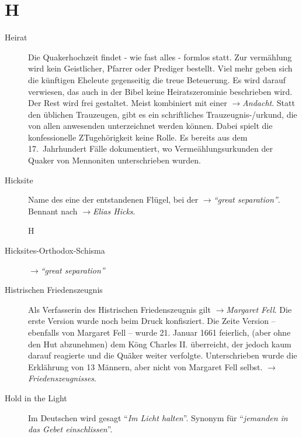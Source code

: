 \section*{H}

\articlesize

\begin{description}

 \item[Heirat] Die Quakerhochzeit findet - wie fast alles - formlos statt. Zur
 vermählung wird kein Geistlicher, Pfarrer oder Prediger bestellt. Viel mehr
 geben sich die künftigen Eheleute gegenseitig die treue Beteuerung. Es wird
 darauf verwiesen, das auch in der Bibel keine Heiratszerominie beschrieben
 wird. Der Rest wird frei gestaltet. Meist kombiniert mit einer
 $\to$\textit{Andacht}. Statt den üblichen Trauzeugen, gibt es ein schriftliches
 Trauzeugnis-/urkund, die von allen anwesenden unterzeichnet werden können.
 Dabei spielt die konfessionelle ZTugehörigkeit keine Rolle. Es bereits aus dem
 17.~Jahrhundert Fälle dokumentiert, wo Vermeählungsurkunden der Quaker von
 Mennoniten unterschrieben wurden.


 \item[Hicksite] Name des eine der entstandenen Flügel, bei der
 $\to$\textit{"`great separation"'}. Bennant nach $\to$\textit{Elias Hicks}.

 H\item[Hicksites-Orthodox-Schisma]  $\to$\textit{"`great separation"'}

 \item[Histrischen Friedenszeugnis] Als Verfasserin des Histrischen Friedenszeugnis gilt $\to$\textit{Margaret Fell}. Die erste Version wurde noch beim Druck konfisziert. Die Zeite Version -- ebenfalls von Margaret Fell -- wurde 21. Januar 1661 feierlich, (aber ohne den Hut abzunehmen) dem Köng Charles II. überreicht, der jedoch kaum darauf reagierte und die Quäker weiter verfolgte. Unterschrieben wurde die Erklährung von 13 Männern, aber nicht von Margaret Fell selbst. $\to$\textit{Friedenszeugnisses}.

\item[Hold in the Light] Im Deutschen wird gesagt "`\textit{Im Licht halten}"'.
Synonym für "`\textit{jemanden in das Gebet einschlissen}"'.


 \end{description}

\normalsize
